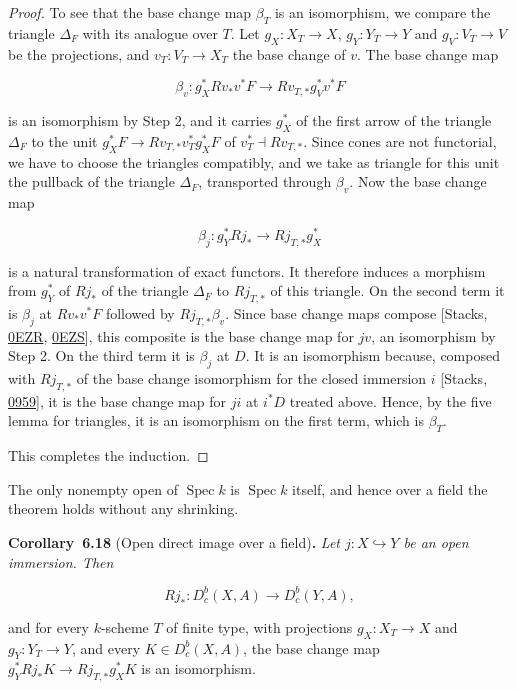 \documentclass[11pt]{article}
\newenvironment{bpstatement}[2]{\par\addvspace{0.6\baselineskip}\noindent\textbf{#1}#2\textbf{.}\enspace\ignorespaces}
  {\par\addvspace{0.4\baselineskip}}
\newenvironment{bpstatementit}[2]{\begin{bpstatement}{#1}{#2}\itshape\ignorespaces}{\end{bpstatement}}
\providecommand{\Dbc}{}\renewcommand{\Dbc}{D^b_c}
\begin{document}
\begin{proof}[{Proof}]
To see that the base change map \(\beta_T\) is an isomorphism, we compare the triangle \(\Delta_F\) with its analogue over \(T\). Let \(g_X:X_T\to X\), \(g_Y:Y_T\to Y\) and \(g_V:V_T\to V\) be the projections, and \(v_T:V_T\to X_T\) the base change of \(v\). The base change map

\[
\beta_v:g_X^*Rv_*v^*F\longrightarrow Rv_{T,*}g_V^*v^*F
\]

is an isomorphism by Step 2, and it carries \(g_X^*\) of the first arrow of the triangle \(\Delta_F\) to the unit \(g_X^*F\to Rv_{T,*}v_T^*g_X^*F\) of \(v_T^*\dashv Rv_{T,*}\). Since cones are not functorial, we have to choose the triangles compatibly, and we take as triangle for this unit the pullback of the triangle \(\Delta_F\), transported through \(\beta_v\). Now the base change map

\[
\beta_j:g_Y^*Rj_*\longrightarrow Rj_{T,*}g_X^*
\]

is a natural transformation of exact functors. It therefore induces a morphism from \(g_Y^*\) of \(Rj_*\) of the triangle \(\Delta_F\) to \(Rj_{T,*}\) of this triangle. On the second term it is \(\beta_j\) at \(Rv_*v^*F\) followed by \(Rj_{T,*}\beta_v\). Since base change maps compose [Stacks, \href{https://stacks.math.columbia.edu/tag/0EZR}{0EZR}, \href{https://stacks.math.columbia.edu/tag/0EZS}{0EZS}], this composite is the base change map for \(jv\), an isomorphism by Step 2. On the third term it is \(\beta_j\) at \(D\). It is an isomorphism because, composed with \(Rj_{T,*}\) of the base change isomorphism for the closed immersion \(i\) [Stacks, \href{https://stacks.math.columbia.edu/tag/0959}{0959}], it is the base change map for \(ji\) at \(i^*D\) treated above. Hence, by the five lemma for triangles, it is an isomorphism on the first term, which is \(\beta_T\).

This completes the induction.
\end{proof}

\label{bp565}%
The only nonempty open of \(\operatorname{Spec}k\) is \(\operatorname{Spec}k\) itself, and hence over a field the theorem holds without any shrinking.

\label{bp566}%
\begin{bpstatementit}{Corollary~6.18}{ (Open direct image over a field)}
Let \(j:X\hookrightarrow Y\) be an open immersion. Then

\[
Rj_*:\Dbc(X,A)\longrightarrow\Dbc(Y,A),
\tag{6.22}
\]

and for every \(k\)-scheme \(T\) of finite type, with projections \(g_X:X_T\to X\) and \(g_Y:Y_T\to Y\), and every \(K\in\Dbc(X,A)\), the base change map \(g_Y^*Rj_*K\to Rj_{T,*}g_X^*K\) is an isomorphism.
\end{bpstatementit}
\end{document}
